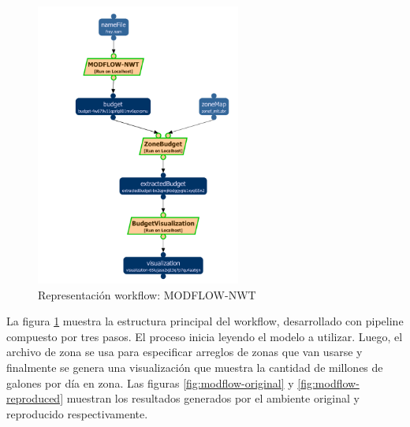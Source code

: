 \begin{figure}[t]
\centering
\includegraphics[width=0.6\textwidth]{Figures/usgs-modflow-nwt}
\caption{Representación workflow: MODFLOW-NWT}
\label{fig:modflow}
\end{figure}


La figura \ref{fig:modflow} muestra la estructura principal del workflow, desarrollado con pipeline compuesto por tres pasos. El proceso inicia leyendo el modelo a utilizar. Luego, el archivo de zona se usa para especificar arreglos de zonas que van usarse y finalmente se genera una visualización que muestra la cantidad de millones de galones por día en zona. Las figuras \ref{fig:modflow-original} y \ref{fig:modflow-reproduced} muestran los resultados generados por el ambiente original y reproducido respectivamente.

